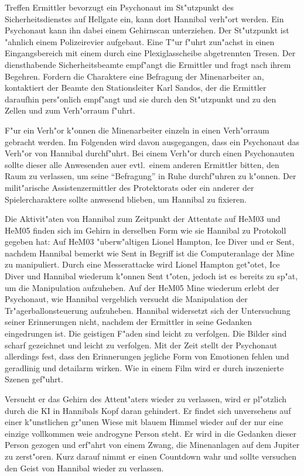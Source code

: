 
Treffen Ermittler bevorzugt ein Psychonaut im St"utzpunkt des Sicherheitsdienstes auf Hellgate ein, kann dort Hannibal verh"ort werden. Ein Psychonaut kann ihn dabei einem Gehirnscan unterziehen. Der St"utzpunkt ist "ahnlich einem Polizeirevier aufgebaut. Eine T"ur f"uhrt zun"achst in einen Eingangsbereich mit einem durch eine Plexiglasscheibe abgetrennten Tresen. Der diensthabende Sicherheitsbeamte empf"angt die Ermittler und fragt nach ihrem Begehren. Fordern die Charaktere eine Befragung der Minenarbeiter an, kontaktiert der Beamte den Stationsleiter Karl Sandos, der die Ermittler daraufhin pers"onlich empf"angt und sie durch den St"utzpunkt und zu den Zellen und zum Verh"orraum f"uhrt.

F"ur ein Verh"or k"onnen die Minenarbeiter einzeln in einen Verh"orraum gebracht werden. Im Folgenden wird davon ausgegangen, dass ein Psychonaut das Verh"or von Hannibal durchf"uhrt. Bei einem Verh"or durch einen Psychonauten sollte dieser alle Anwesenden au\3er evtl.~einem anderen Ermittler bitten, den Raum zu verlassen, um seine "`Befragung"' in Ruhe durchf"uhren zu k"onnen. Der milit"arische Assistenzermittler des Protektorats oder ein anderer der Spielercharaktere sollte anwesend blieben, um Hannibal zu fixieren. 

Die Aktivit"aten von Hannibal zum Zeitpunkt der Attentate auf HeM03 und HeM05 finden sich im Gehirn in derselben Form wie sie Hannibal zu Protokoll gegeben hat: Auf HeM03 "uberw"altigen Lionel Hampton, Ice Diver und er Sent, nachdem Hannibal bemerkt wie Sent in Begriff ist die Computeranlage der Mine zu manipuliert. Durch eine Messerattacke wird Lionel Hampton get"otet, Ice Diver und Hannibal wiederum k"onnen Sent t"oten, jedoch ist es bereits zu sp"at, um die Manipulation aufzuheben. Auf der HeM05 Mine wiederum erlebt der Psychonaut, wie Hannibal vergeblich versucht die Manipulation der Tr"agerballonsteuerung aufzuheben. Hannibal widersetzt sich der Untersuchung seiner Erinnerungen nicht, nachdem der Ermittler in seine Gedanken eingedrungen ist. Die geistigen F"aden sind leicht zu verfolgen. Die Bilder sind scharf gezeichnet und leicht zu verfolgen. Mit der Zeit stellt der Psychonaut allerdings fest, dass den Erinnerungen jegliche Form von Emotionen fehlen und geradlinig und detailarm wirken. Wie in einem Film wird er durch inszenierte Szenen gef"uhrt. 

Versucht er das Gehirn des Attent"aters wieder zu verlassen, wird er pl"otzlich durch die KI in Hannibals Kopf daran gehindert. Er findet sich unversehens auf einer k"unstlichen gr"unen Wiese mit blauem Himmel wieder auf der nur eine einzige vollkommen wei\3e androgyne Person steht. Er wird in die Gedanken dieser Person gezogen und erf"ahrt von einem Zwang, die Minenanlagen auf dem Jupiter zu zerst"oren. Kurz darauf nimmt er einen Countdown wahr und sollte versuchen den Geist von Hannibal wieder zu verlassen.

